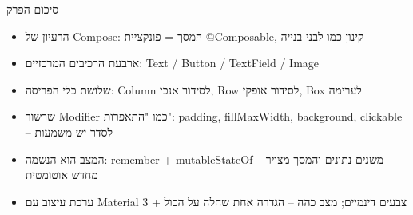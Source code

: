 \begin{tcbsummary}{סיכום הפרק}
\begin{itemize}
  \item הרעיון של Compose: המסך = פונקציית @Composable, קינון כמו לבני בנייה
  \item ארבעת הרכיבים המרכזיים: Text / Button / TextField / Image
  \item שלושת כלי הפריסה: Column לסידור אנכי, Row לסידור אופקי, Box לערימה
  \item שרשור Modifier כמו "התאפרות": padding, fillMaxWidth, background, clickable – לסדר יש משמעות
  \item המצב הוא הנשמה: remember + mutableStateOf – משנים נתונים והמסך מצויר מחדש אוטומטית
  \item ערכת עיצוב עם Material 3 + צבעים דינמיים; מצב כהה – הגדרה אחת שחלה על הכול
\end{itemize}

\end{tcbsummary}
